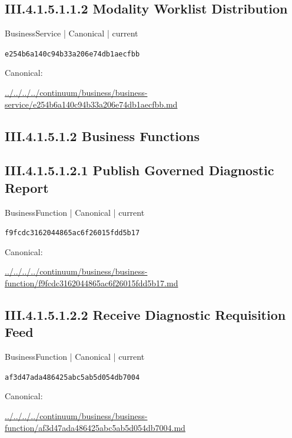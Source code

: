 \documentclass[10pt,a4paper]{article}
\begin{document}
\subsection*{III.4.1.5.1.1.2 Modality Worklist Distribution}
\label{element-e254b6a140c94b33a206e74db1aecfbb}
{\small BusinessService | Canonical | current}\par
\texttt{e254b6a140c94b33a206e74db1aecfbb}\par
Canonical: \par
{\footnotesize\url{../../../../continuum/business/business-service/e254b6a140c94b33a206e74db1aecfbb.md}}\par
\subsection*{III.4.1.5.1.2 Business Functions}
\subsection*{III.4.1.5.1.2.1 Publish Governed Diagnostic Report}
\label{element-f9fcdc3162044865ac6f26015fdd5b17}
{\small BusinessFunction | Canonical | current}\par
\texttt{f9fcdc3162044865ac6f26015fdd5b17}\par
Canonical: \par
{\footnotesize\url{../../../../continuum/business/business-function/f9fcdc3162044865ac6f26015fdd5b17.md}}\par
\subsection*{III.4.1.5.1.2.2 Receive Diagnostic Requisition Feed}
\label{element-af3d47ada486425abc5ab5d054db7004}
{\small BusinessFunction | Canonical | current}\par
\texttt{af3d47ada486425abc5ab5d054db7004}\par
Canonical: \par
{\footnotesize\url{../../../../continuum/business/business-function/af3d47ada486425abc5ab5d054db7004.md}}\par
\end{document}

